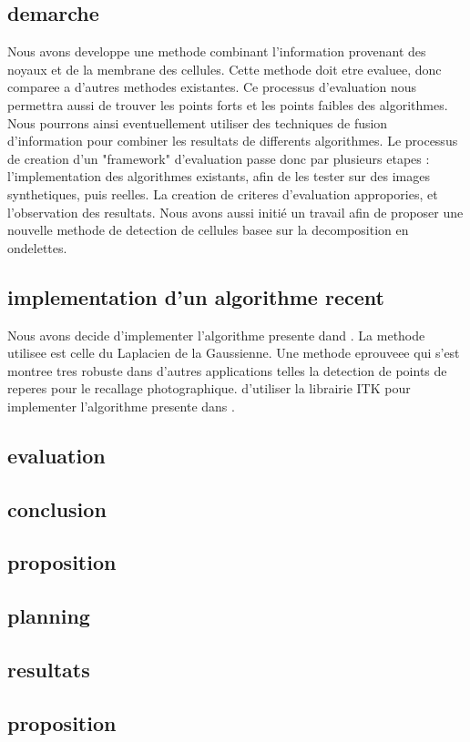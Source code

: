 \subsection{demarche}

Nous avons developpe une methode combinant l'information provenant des noyaux et de la membrane des cellules. Cette methode doit etre evaluee, donc comparee a d'autres methodes existantes. Ce processus d'evaluation nous permettra aussi de trouver les points forts et les points faibles des algorithmes. Nous pourrons ainsi eventuellement utiliser des techniques de fusion d'information pour combiner les resultats de differents algorithmes.
Le processus de creation d'un "framework" d'evaluation passe donc par plusieurs etapes : l'implementation des algorithmes existants, afin de les tester sur des images synthetiques, puis reelles. La creation de criteres d'evaluation appropories, et l'observation des resultats. Nous avons aussi initié un travail afin de proposer une nouvelle methode de detection de cellules basee sur la decomposition en ondelettes.


\subsection {implementation d'un algorithme recent}

Nous avons decide d'implementer l'algorithme presente dand \cite{al2009improved}. La methode utilisee est celle du Laplacien de la Gaussienne. Une methode eprouveee qui s'est montree tres robuste dans d'autres applications telles la detection de points de reperes pour le recallage photographique.
d'utiliser la librairie ITK pour implementer l'algorithme presente dans .

\subsection {evaluation}



\subsection {conclusion}


\subsection {proposition}



\subsection {planning}


\subsection{resultats}

\subsection{proposition}




